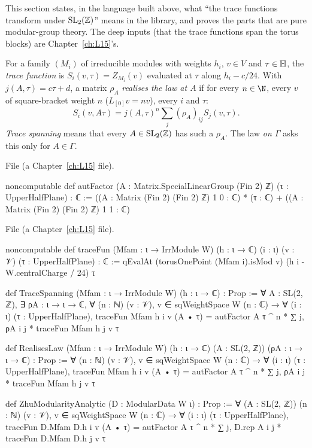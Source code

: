 This section states, in the language built above, what ``the trace functions transform under $\mathrm{SL}_2(\mathbb{Z})$'' means in the
library, and proves the parts that are pure modular-group theory. The deep inputs (that the trace functions span the torus
blocks) are Chapter~\ref{ch:L15}'s.

\begin{definition}\label{l14:def:realises}
For a family $(M_i)$ of irreducible modules with weights $h_i$, $v\in V$ and $\tau\in\mathbb{H}$, the \emph{trace function}
is $S_i(v,\tau) = Z_{M_i}(v)$ evaluated at $\tau$ along $h_i - c/24$. With $j(A,\tau) = c\tau+d$, a matrix $\rho_A$
\emph{realises the law at $A$} if for every $n\in\N$, every $v$ of square-bracket weight $n$ ($L_{[0]}v = nv$), every $i$ and
$\tau$:
\begin{equation*}
  S_i(v,A\tau) = j(A,\tau)^n\sum_j(\rho_A)_{ij}S_j(v,\tau).
\end{equation*}
\emph{Trace spanning} means that every $A\in\mathrm{SL}_2(\mathbb{Z})$ has such a $\rho_A$. The law \emph{on $\Gamma$} asks this only for
$A\in\Gamma$.
\end{definition}
\noindent File  (a Chapter~\ref{ch:L15} file).
\begin{leancode}
noncomputable def autFactor (A : Matrix.SpecialLinearGroup (Fin 2) ℤ) (τ : UpperHalfPlane) : ℂ :=
  ((A : Matrix (Fin 2) (Fin 2) ℤ) 1 0 : ℂ) * (τ : ℂ)
    + ((A : Matrix (Fin 2) (Fin 2) ℤ) 1 1 : ℂ)
\end{leancode}
\noindent File  (a Chapter~\ref{ch:L15} file).
\begin{leancode}
noncomputable def traceFun (Mfam : ι → IrrModule W) (h : ι → ℂ) (i : ι) (v : 𝒱)
    (τ : UpperHalfPlane) : ℂ :=
  qEvalAt (torusOnePoint (Mfam i).isMod v) (h i - W.centralCharge / 24) τ

def TraceSpanning (Mfam : ι → IrrModule W) (h : ι → ℂ) : Prop :=
  ∀ A : SL(2, ℤ), ∃ ρA : ι → ι → ℂ, ∀ (n : ℕ) (v : 𝒱), v ∈ sqWeightSpace W (n : ℂ) →
    ∀ (i : ι) (τ : UpperHalfPlane),
      traceFun Mfam h i v (A • τ) = autFactor A τ ^ n * ∑ j, ρA i j * traceFun Mfam h j v τ

def RealisesLaw (Mfam : ι → IrrModule W) (h : ι → ℂ) (A : SL(2, ℤ)) (ρA : ι → ι → ℂ) : Prop :=
  ∀ (n : ℕ) (v : 𝒱), v ∈ sqWeightSpace W (n : ℂ) → ∀ (i : ι) (τ : UpperHalfPlane),
    traceFun Mfam h i v (A • τ) = autFactor A τ ^ n * ∑ j, ρA i j * traceFun Mfam h j v τ

def ZhuModularityAnalytic (D : ModularData W ι) : Prop :=
  ∀ (A : SL(2, ℤ)) (n : ℕ) (v : 𝒱), v ∈ sqWeightSpace W (n : ℂ) → ∀ (i : ι) (τ : UpperHalfPlane),
    traceFun D.Mfam D.h i v (A • τ)
      = autFactor A τ ^ n * ∑ j, D.rep A i j * traceFun D.Mfam D.h j v τ
\end{leancode}
